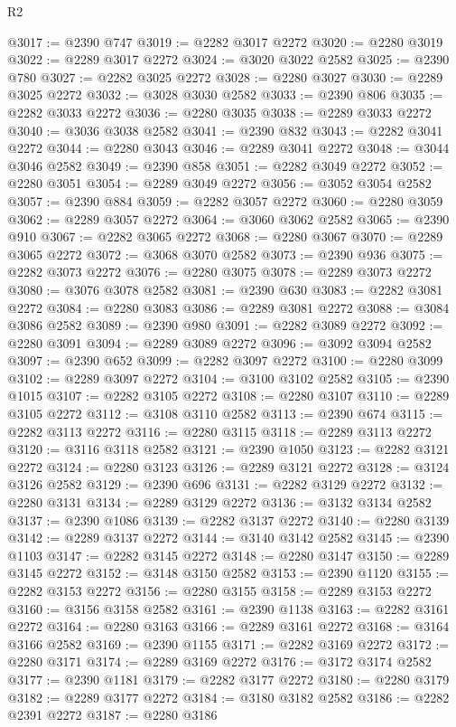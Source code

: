 \begin{lexlean}{R2}
\begin{coremodule}
@3017 := @2390 @747
@3019 := @2282 @3017 @2272
@3020 := @2280 @3019
@3022 := @2289 @3017 @2272
@3024 := @3020 @3022 @2582
@3025 := @2390 @780
@3027 := @2282 @3025 @2272
@3028 := @2280 @3027
@3030 := @2289 @3025 @2272
@3032 := @3028 @3030 @2582
@3033 := @2390 @806
@3035 := @2282 @3033 @2272
@3036 := @2280 @3035
@3038 := @2289 @3033 @2272
@3040 := @3036 @3038 @2582
@3041 := @2390 @832
@3043 := @2282 @3041 @2272
@3044 := @2280 @3043
@3046 := @2289 @3041 @2272
@3048 := @3044 @3046 @2582
@3049 := @2390 @858
@3051 := @2282 @3049 @2272
@3052 := @2280 @3051
@3054 := @2289 @3049 @2272
@3056 := @3052 @3054 @2582
@3057 := @2390 @884
@3059 := @2282 @3057 @2272
@3060 := @2280 @3059
@3062 := @2289 @3057 @2272
@3064 := @3060 @3062 @2582
@3065 := @2390 @910
@3067 := @2282 @3065 @2272
@3068 := @2280 @3067
@3070 := @2289 @3065 @2272
@3072 := @3068 @3070 @2582
@3073 := @2390 @936
@3075 := @2282 @3073 @2272
@3076 := @2280 @3075
@3078 := @2289 @3073 @2272
@3080 := @3076 @3078 @2582
@3081 := @2390 @630
@3083 := @2282 @3081 @2272
@3084 := @2280 @3083
@3086 := @2289 @3081 @2272
@3088 := @3084 @3086 @2582
@3089 := @2390 @980
@3091 := @2282 @3089 @2272
@3092 := @2280 @3091
@3094 := @2289 @3089 @2272
@3096 := @3092 @3094 @2582
@3097 := @2390 @652
@3099 := @2282 @3097 @2272
@3100 := @2280 @3099
@3102 := @2289 @3097 @2272
@3104 := @3100 @3102 @2582
@3105 := @2390 @1015
@3107 := @2282 @3105 @2272
@3108 := @2280 @3107
@3110 := @2289 @3105 @2272
@3112 := @3108 @3110 @2582
@3113 := @2390 @674
@3115 := @2282 @3113 @2272
@3116 := @2280 @3115
@3118 := @2289 @3113 @2272
@3120 := @3116 @3118 @2582
@3121 := @2390 @1050
@3123 := @2282 @3121 @2272
@3124 := @2280 @3123
@3126 := @2289 @3121 @2272
@3128 := @3124 @3126 @2582
@3129 := @2390 @696
@3131 := @2282 @3129 @2272
@3132 := @2280 @3131
@3134 := @2289 @3129 @2272
@3136 := @3132 @3134 @2582
@3137 := @2390 @1086
@3139 := @2282 @3137 @2272
@3140 := @2280 @3139
@3142 := @2289 @3137 @2272
@3144 := @3140 @3142 @2582
@3145 := @2390 @1103
@3147 := @2282 @3145 @2272
@3148 := @2280 @3147
@3150 := @2289 @3145 @2272
@3152 := @3148 @3150 @2582
@3153 := @2390 @1120
@3155 := @2282 @3153 @2272
@3156 := @2280 @3155
@3158 := @2289 @3153 @2272
@3160 := @3156 @3158 @2582
@3161 := @2390 @1138
@3163 := @2282 @3161 @2272
@3164 := @2280 @3163
@3166 := @2289 @3161 @2272
@3168 := @3164 @3166 @2582
@3169 := @2390 @1155
@3171 := @2282 @3169 @2272
@3172 := @2280 @3171
@3174 := @2289 @3169 @2272
@3176 := @3172 @3174 @2582
@3177 := @2390 @1181
@3179 := @2282 @3177 @2272
@3180 := @2280 @3179
@3182 := @2289 @3177 @2272
@3184 := @3180 @3182 @2582
@3186 := @2282 @2391 @2272
@3187 := @2280 @3186

\end{coremodule}
\end{lexlean}
